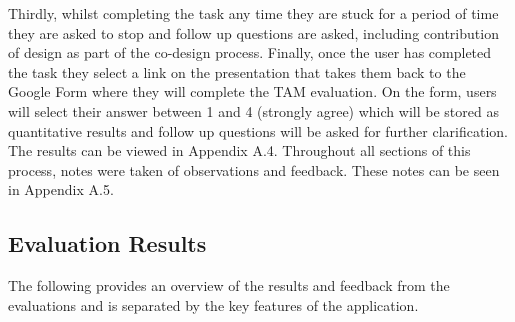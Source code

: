 \documentclass[a4 paper, 12pt]{article}
\begin{document}
Thirdly, whilst completing the task any time they are stuck for a period of time they are asked to stop and follow up questions are asked, including contribution of design as part of the co-design process. Finally, once the user has completed the task they select a link on the presentation that takes them back to the Google Form where they will complete the TAM evaluation. On the form, users will select their answer between 1 and 4 (strongly agree) which will be stored as quantitative results and follow up questions will be asked for further clarification. The results can be viewed in Appendix A.4. Throughout all sections of this process, notes were taken of observations and feedback. These notes can be seen in Appendix A.5.

\subsection{Evaluation Results}
The following provides an overview of the results and feedback from the evaluations and is separated by the key features of the application.
\end{document}
